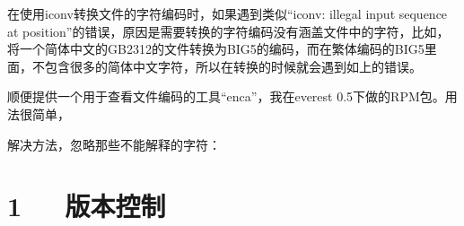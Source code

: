 \documentclass[letterpaper,12pt,english]{sphinxmanual}
\begin{document}
在使用iconv转换文件的字符编码时，如果遇到类似“iconv: illegal input sequence at position”的错误，原因是需要转换的字符编码没有涵盖文件中的字符，比如，将一个简体中文的GB2312的文件转换为BIG5的编码，而在繁体编码的BIG5里面，不包含很多的简体中文字符，所以在转换的时候就会遇到如上的错误。

顺便提供一个用于查看文件编码的工具“enca”，我在everest 0.5下做的RPM包。用法很简单，

\begin{sphinxVerbatim}[commandchars=\\\{\}]
\end{sphinxVerbatim}

解决方法，忽略那些不能解释的字符：

\begin{sphinxVerbatim}[commandchars=\\\{\}]
         
\end{sphinxVerbatim}


\chapter{1   版本控制}
\label{\detokenize{001software/001install/_u7248_u672c_u63a7_u5236_u8f6f_u4ef6:id1}}\label{\detokenize{001software/001install/_u7248_u672c_u63a7_u5236_u8f6f_u4ef6::doc}}
\end{document}
